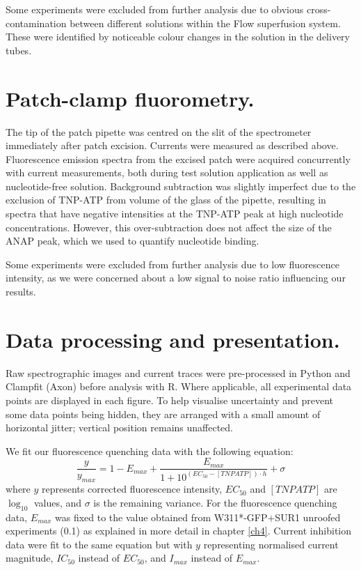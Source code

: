 Some experiments were excluded from further analysis due to obvious cross-contamination between different solutions within the \si{\micro}Flow superfusion system.
These were identified by noticeable colour changes in the solution in the delivery tubes.

\section{Patch-clamp fluorometry.}
The tip of the patch pipette was centred on the slit of the spectrometer immediately after patch excision.
Currents were measured as described above.
Fluorescence emission spectra from the excised patch were acquired concurrently with current measurements, both during test solution application as well as nucleotide-free solution.
Background subtraction was slightly imperfect due to the exclusion of TNP-ATP from volume of the glass of the pipette, resulting in spectra that have negative intensities at the TNP-ATP peak at high nucleotide concentrations.
However, this over-subtraction does not affect the size of the ANAP peak, which we used to quantify nucleotide binding.

Some experiments were excluded from further analysis due to low fluorescence intensity, as we were concerned about a low signal to noise ratio influencing our results.

\section{Data processing and presentation.}
Raw spectrographic images and current traces were pre-processed in Python and Clampfit (Axon) before analysis with R.
Where applicable, all experimental data points are displayed in each figure.
To help visualise uncertainty and prevent some data points being hidden, they are arranged with a small amount of horizontal jitter; vertical position remains unaffected.

We fit our fluorescence quenching data with the following equation:
\begin{equation} \label{eq:hill}
    \frac{y}{y_{max}} = 1 - E_{max} + \frac{E_{max}}{1 + 10^{(EC_{50} - [TNPATP]) \cdot h}} + \sigma
\end{equation}
where $y$ represents corrected fluorescence intensity, $EC_{50}$ and $[TNPATP]$ are $\log_{10}$ values, and $\sigma$ is the remaining variance.
For the fluorescence quenching data, $E_{max}$ was fixed to the value obtained from W311*-GFP+SUR1 unroofed experiments (0.1) as explained in more detail in chapter \ref{ch4}.
Current inhibition data were fit to the same equation but with $y$ representing normalised current magnitude, $IC_{50}$ instead of $EC_{50}$, and $I_{max}$ instead of $E_{max}$.


